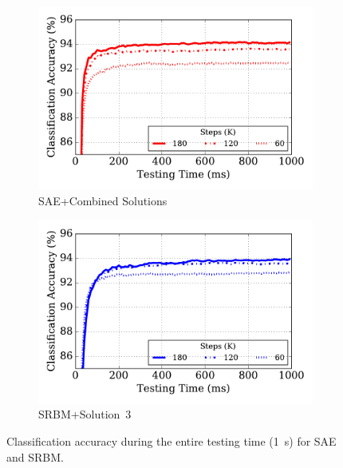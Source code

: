 \begin{figure}
	\centering
	\begin{subfigure}[t]{0.45\textwidth}
		\includegraphics[width=\textwidth]{pics_sdlm/43_MNIST_SAE_all/latency.pdf}
		\caption{SAE+Combined Solutions}
	\end{subfigure}
	\begin{subfigure}[t]{0.45\textwidth}
		\includegraphics[width=\textwidth]{pics_sdlm/51_MNIST_SRBM_teach/latency.pdf}
		\caption{SRBM+Solution~3}
	\end{subfigure}
	\caption{Classification accuracy during the entire testing time (1~s) for SAE and SRBM.}
	\label{fig:latency}
\end{figure}

